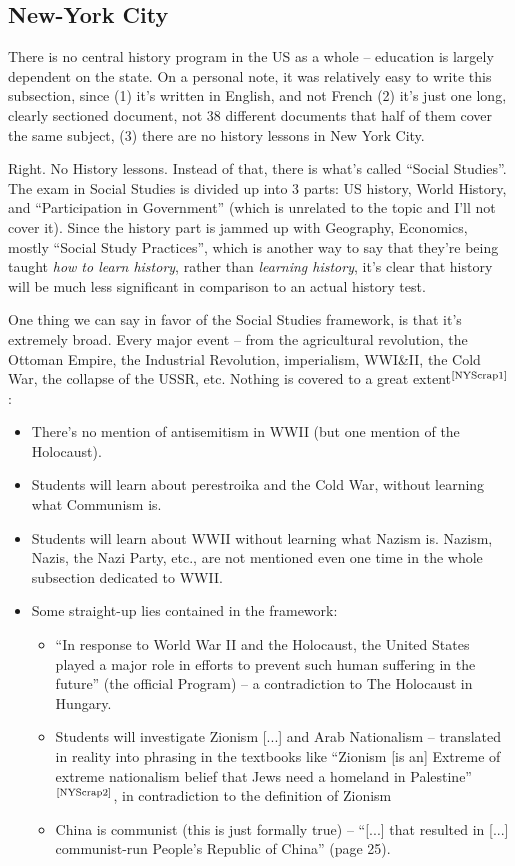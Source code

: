 \documentclass[12pt]{article}
\newcommand\mc[1]  {$^{\text{\cite{#1}}}$}
\begin{document}
	\subsection{New-York City}
	There is no central history program in the US as a whole -- education is largely dependent on the state. On a personal note, it was relatively easy to write this subsection, since (1) it's written in English, and not French (2) it's just one long, clearly sectioned document, not 38 different documents that half of them cover the same subject, (3) there are no history lessons in New York City. 
	
	Right. No History lessons. Instead of that, there is what's called ``Social Studies''. The exam in Social Studies is divided up into 3 parts: US history, World History, and ``Participation in Government'' (which is unrelated to the topic and I'll not cover it). Since the history part is jammed up with Geography, Economics, mostly ``Social Study Practices'', which is another way to say that they're being taught \textit{how to learn history}, rather than \textit{learning history}, it's clear that history will be much less significant in comparison to an actual history test. 
	
	One thing we can say in favor of the Social Studies framework, is that it's extremely broad. Every major event -- from the agricultural revolution, the Ottoman Empire, the Industrial Revolution, imperialism, WWI\&II, the Cold War, the collapse of the USSR, etc. Nothing is covered to a great extent\mc{NYScrap1}: 
	\begin{itemize}
		\item There's no mention of antisemitism in WWII (but one mention of the Holocaust). 
		\item Students will learn about perestroika and the Cold War, without learning what Communism is. 
		\item Students will learn about WWII without learning what Nazism is. Nazism, Nazis, the Nazi Party, etc., are not mentioned even one time in the whole subsection dedicated to WWII. 
		\item Some straight-up lies contained in the framework: 
		\begin{itemize}
			\item ``In response to World War II and the Holocaust, the United States played a major role in
			efforts to prevent such human suffering in the future'' (the official Program) -- a contradiction to The Holocaust in Hungary. 
			\item Students will investigate Zionism [...] and Arab Nationalism -- translated in reality into phrasing in the textbooks like ``Zionism [is an] Extreme of extreme nationalism belief that Jews need a homeland in Palestine''\mc{NYScrap2}, in contradiction to the definition of Zionism 
			\item China is communist (this is just formally true) -- ``[...] that resulted in [...] communist-run People’s Republic of China'' (page 25). 
		\end{itemize}
	\end{itemize}
	
\end{document}
